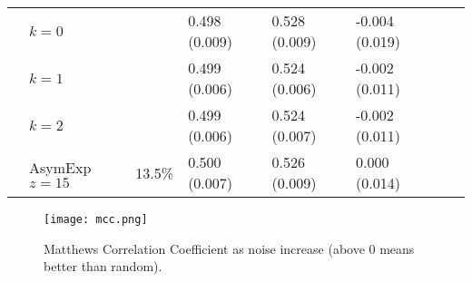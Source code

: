 \documentclass[a4paper,final,notitlepage,11pt,svgnames]{scrartcl}
\begin{document}
\begin{table}[htpb]
\begin{tabular}{llllllll}
		& $k=0$          &              & 0.498 (0.009) & 0.528 (0.009) & -0.004 (0.019) &               & \\
		& $k=1$          &              & 0.499 (0.006) & 0.524 (0.006) & -0.002 (0.011) &               & \\
		& $k=2$          &              & 0.499 (0.006) & 0.524 (0.007) & -0.002 (0.011) &               & \\
		& AsymExp $z=15$ & 13.5\%       & 0.500 (0.007) & 0.526 (0.009) & 0.000 (0.014)  &               & \\
		\bottomrule
	\end{tabular}
\end{table}

\begin{figure}[htpb]
	\centering
	\texttt{[image: mcc.png]}
	\caption{Matthews Correlation Coefficient as noise increase (above 0 means better than random).
	\label{fig:mcc}}
\end{figure}
\end{document}
